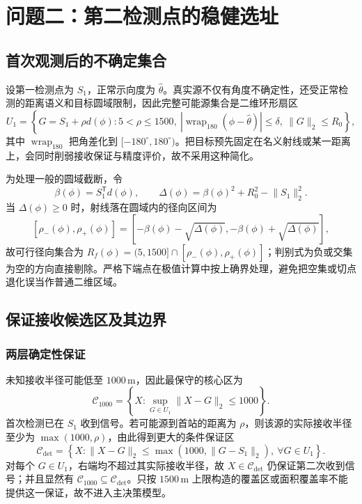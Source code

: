 \section{问题二：第二检测点的稳健选址}

\subsection{首次观测后的不确定集合}
设第一检测点为 $S_1$，正常示向度为 $\hat\theta$。真实源不仅有角度不确定性，还受正常检测的距离语义和目标圆域限制，因此完整可能源集合是二维环形扇区
\[
U_1=\left\{G=S_1+\rho d(\phi):
5<\rho\le1500,\ 
\left|\operatorname{wrap}_{180}(\phi-\hat\theta)\right|\le\delta,
\ \lVert G\rVert_2\le R_0\right\},
\]
其中 $\operatorname{wrap}_{180}$ 把角差化到 $[-180^\circ,180^\circ)$。把目标预先固定在名义射线或某一距离上，会同时削弱接收保证与精度评价，故不采用这种简化。

为处理一般的圆域截断，令
\[
\beta(\phi)=S_1^{\mathsf T}d(\phi),\qquad
\Delta(\phi)=\beta(\phi)^2+R_0^2-\lVert S_1\rVert_2^2.
\]
当 $\Delta(\phi)\ge0$ 时，射线落在圆域内的径向区间为
\[
[\rho_-(\phi),\rho_+(\phi)]
=\left[-\beta(\phi)-\sqrt{\Delta(\phi)},
-\beta(\phi)+\sqrt{\Delta(\phi)}\right],
\]
故可行径向集合为 $R_f(\phi)=(5,1500]\cap[\rho_-(\phi),\rho_+(\phi)]$；判别式为负或交集为空的方向直接剔除。严格下端点在极值计算中按上确界处理，避免把空集或切点退化误当作普通二维区域。

\subsection{保证接收候选区及其边界}

\subsubsection{两层确定性保证}
未知接收半径可能低至 $1000\,\mathrm m$，因此最保守的核心区为
\[
\mathcal C_{1000}=\left\{X:
\sup_{G\in U_1}\lVert X-G\rVert_2\le1000\right\}.
\]
首次检测已在 $S_1$ 收到信号。若可能源到首站的距离为 $\rho$，则该源的实际接收半径至少为 $\max(1000,\rho)$，由此得到更大的条件保证区
\[
\mathcal C_{\det}=\left\{X:
\lVert X-G\rVert_2\le
\max(1000,\lVert G-S_1\rVert_2),\ \forall G\in U_1\right\}.
\]
对每个 $G\in U_1$，右端均不超过其实际接收半径，故 $X\in\mathcal C_{\det}$ 仍保证第二次收到信号；并且显然有 $\mathcal C_{1000}\subseteq\mathcal C_{\det}$。只按 $1500\,\mathrm m$ 上限构造的覆盖区或面积覆盖率不能提供这一保证，故不进入主决策模型。

